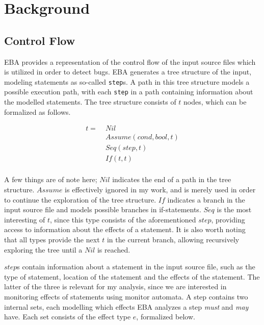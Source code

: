 \section{Background}


\subsection{Control Flow}

EBA provides a representation of the control flow of the input source files which is utilized in order to detect bugs. EBA generates a tree structure of the input, modeling statements as so-called \texttt{step}s. A path in this tree structure models a possible execution path, with each \texttt{step} in a path containing information about the modelled statements. The tree structure consists of $t$ nodes, which can be formalized as follows.

\begin{equation*} 
    \begin{aligned}
        t =\;& \mathit{Nil} \\
        & \mathit{Assume} (cond, bool, t) \\
        & \mathit{Seq} (step, t) \\
        & \mathit{If} (t, t) \\
    \end{aligned}
\end{equation*}

\noindent A few things are of note here; $Nil$ indicates the end of a path in the tree structure. $Assume$ is effectively ignored in my work, and is merely used in order to continue the exploration of the tree structure. $If$ indicates a branch in the input source file and models possible branches in if-statements. $Seq$ is the most interesting of $t$, since this type consists of the aforementioned $step$, providing access to information about the effects of a statement. It is also worth noting that all types provide the next $t$ in the current branch, allowing recursively exploring the tree until a $Nil$ is reached. 

\newpar $step$s contain information about a statement in the input source file, such as the type of statement, location of the statement and the effects of  the statement. The latter of the three is relevant for my analysis, since we are interested in monitoring effects of statements using monitor automata. A step contains two internal sets, each modelling which effects EBA analyzes a step \textit{must} and \textit{may} have. Each set consists of the effect type $e$, formalized below. 

